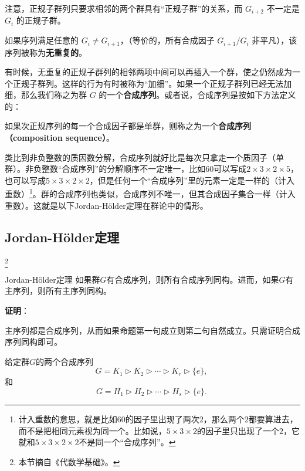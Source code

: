 注意，正规子群列只要求相邻的两个群具有“正规子群”的关系，而 $G_{i+2}$ 不一定是 $G_i$ 的正规子群。

如果序列满足任意的 $G_{i} \neq G_{i+1}$，（等价的，所有合成因子 $G_{i+1} / G_{i}$ 非平凡），该序列被称为\textbf{无重复的}。


有时候，无重复的正规子群列的相邻两项中间可以再插入一个群，使之仍然成为一个正规子群列。这样的行为有时被称为“加细”。如果一个正规子群列已经无法加细，那么我们称之为群 $G$ 的一个\textbf{合成序列}。或者说，合成序列是按如下方法定义的：

\begin{definition}{}

如果次正规序列的每一个合成因子都是单群，则称之为一个\textbf{合成序列（composition sequence）}。

\end{definition}


类比到非负整数的质因数分解，合成序列就好比是每次只拿走一个质因子（单群）。非负整数“合成序列”的分解顺序不一定唯一，比如$60$可以写成$2\times 3\times 2\times 5$，也可以写成$5\times 3\times 2\times 2$，但是任何一个“合成序列”里的元素一定是一样的（计入重数）\footnote{计入重数的意思，就是比如$60$的因子里出现了两次$2$，那么两个$2$都要算进去，而不是把相同元素视为同一个。比如说，$5\times 3 \times 2$的因子里只出现了一个$2$，它就和$5\times 3\times 2\times 2$不是同一个“合成序列”。}。群的合成序列也类似，合成序列不唯一，但其合成因子集合一样（计入重数）。这就是以下Jordan-Hölder定理在群论中的情形。






\subsection{Jordan-Hölder定理}\footnote{本节摘自《代数学基础》。}




\begin{theorem}{Jordan-Hölder定理}
如果群$G$有合成序列，则所有合成序列同构。进而，如果$G$有主序列，则所有主序列同构。
\end{theorem}


\textbf{证明}：

主序列都是合成序列，从而如果命题第一句成立则第二句自然成立。只需证明合成序列同构即可。

给定群$G$的两个合成序列
\begin{equation}
    G= K_1\rhd K_2\rhd \cdots \rhd K_r\rhd \{e\}, 
~\end{equation}
和
\begin{equation}
    G= H_1\rhd H_2\rhd \cdots \rhd H_s\rhd \{e\}. 
~\end{equation}



